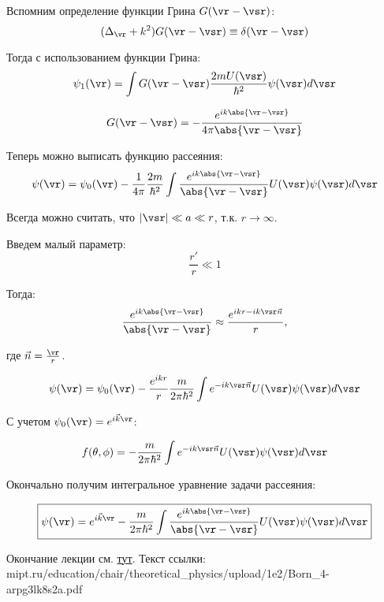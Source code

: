Вспомним определение функции Грина $G(\vr - \vsr)$:
\begin{equation}
\label{eq:19_3_1}
(\Delta_{\vr} + k^2)G(\vr - \vsr) \equiv \delta(\vr - \vsr)
\end{equation}

Тогда с использованием функции Грина:
$$
\psi_1(\vr) = \int G(\vr - \vsr) \frac{2mU(\vsr)}{\hbar^2} \psi(\vsr) d\vsr
$$

$$
G(\vr - \vsr) = - \frac{e^{ik\abs{\vr - \vsr}}}{4\pi\abs{\vr - \vsr}}
$$

Теперь можно выписать функцию рассеяния:
$$
\psi(\vr) = \psi_0(\vr) - \frac{1}{4 \pi}\frac{2m}{\hbar^2}\int \frac{e^{ik\abs{\vr - \vsr}}}{\abs{\vr - \vsr}} U(\vsr)\psi(\vsr)d\vsr
$$

Всегда можно считать, что $|\vsr| \ll a \ll r$, т.к. $r \to \infty$.

Введем малый параметр:
$$
\frac{r'}{r} \ll 1
$$

Тогда:
$$
\frac{e^{ik\abs{\vr - \vsr}}}{\abs{\vr - \vsr}} \approx \frac{e^{ikr - ik\vsr \vec{n}}}{r},
$$

где $\vec{n} = \frac{\vr}{r}$.

$$
\psi(\vr) = \psi_0(\vr) - \frac{e^{ikr}}{r}\frac{m}{2\pi\hbar^2}\int e^{- ik\vsr \vec{n}} U(\vsr)\psi(\vsr)d\vsr
$$

С учетом $\psi_0(\vr) = e^{i\vec{k}\vr}$:

$$
f(\theta, \phi) =  - \frac{m}{2\pi\hbar^2}\int e^{- ik\vsr \vec{n}} U(\vsr)\psi(\vsr)d\vsr
$$

Окончально получим интегральное уравнение задачи рассеяния:

\begin{equation}
\label{eq:19_3_2}
\boxed{\psi(\vr) = e^{i\vec{k}\vr} - \frac{m}{2\pi\hbar^2}\int \frac{e^{ik\abs{\vr - \vsr}}}{\abs{\vr - \vsr}} U(\vsr)\psi(\vsr)d\vsr}
\end{equation}

Окончание лекции см. \href{http://mipt.ru/education/chair/theoretical_physics/upload/1e2/Born_4-arpg3lk8s2a.pdf}{тут}. Текст ссылки: \\
mipt.ru/education/chair/theoretical\_physics/upload/1e2/Born\_4-arpg3lk8s2a.pdf

